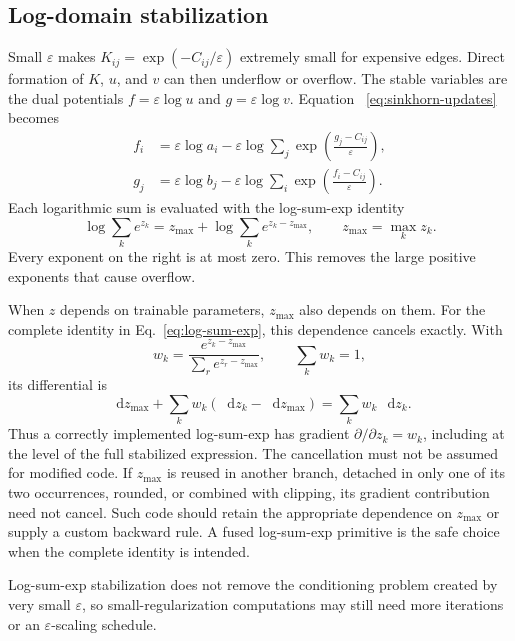 \documentclass[11pt]{article}
\newcommand{\dd}{\mathop{}\!\mathrm{d}}
\begin{document}
\subsection{Log-domain stabilization}

Small $\varepsilon$ makes $K_{ij}=\exp(-C_{ij}/\varepsilon)$ extremely
small for expensive edges. Direct formation of $K$, $u$, and $v$ can then
underflow or overflow. The stable variables are the dual potentials
$f=\varepsilon\log u$ and $g=\varepsilon\log v$. Equation
~\eqref{eq:sinkhorn-updates} becomes
\begin{equation}
  \begin{aligned}
    f_i&=\varepsilon\log a_i
      -\varepsilon\log\sum_j
       \exp\left(\frac{g_j-C_{ij}}{\varepsilon}\right),\\
    g_j&=\varepsilon\log b_j
      -\varepsilon\log\sum_i
       \exp\left(\frac{f_i-C_{ij}}{\varepsilon}\right).
  \end{aligned}
  \label{eq:log-sinkhorn}
\end{equation}
Each logarithmic sum is evaluated with the log-sum-exp identity
\begin{equation}
  \log\sum_k e^{z_k}
  =z_{\max}+\log\sum_k e^{z_k-z_{\max}},
  \qquad z_{\max}=\max_k z_k.
  \label{eq:log-sum-exp}
\end{equation}
Every exponent on the right is at most zero. This removes the large positive
exponents that cause overflow.

When $z$ depends on trainable parameters, $z_{\max}$ also depends on them.
For the complete identity in Eq.~\eqref{eq:log-sum-exp}, this dependence
cancels exactly. With
\[
  w_k=\frac{e^{z_k-z_{\max}}}{\sum_r e^{z_r-z_{\max}}},
  \qquad \sum_k w_k=1,
\]
its differential is
\[
  \dd z_{\max}
  +\sum_k w_k(\dd z_k-\dd z_{\max})
  =\sum_k w_k\,\dd z_k.
\]
Thus a correctly implemented log-sum-exp has gradient
$\partial/\partial z_k=w_k$, including at the level of the full stabilized
expression. The cancellation must not be assumed for modified code. If
$z_{\max}$ is reused in another branch, detached in only one of its two
occurrences, rounded, or combined with clipping, its gradient contribution
need not cancel. Such code should retain the appropriate dependence on
$z_{\max}$ or supply a custom backward rule. A fused log-sum-exp primitive is
the safe choice when the complete identity is intended.

Log-sum-exp stabilization does not remove the conditioning problem
created by very small $\varepsilon$, so small-regularization computations may
still need more iterations or an $\varepsilon$-scaling schedule.
\end{document}
